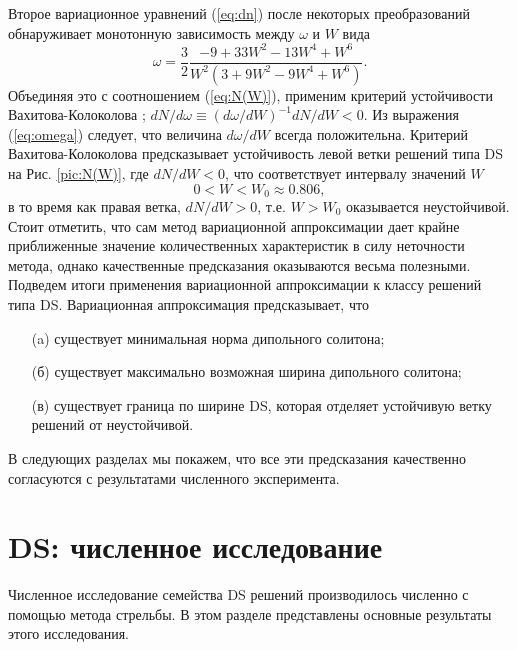 Второе вариационное уравнений (\ref{eq:dn}) после некоторых преобразований обнаруживает монотонную зависимость между $\omega$ и $W$ вида
%
\begin{equation}
\omega =\frac{3}{2}\frac{-9+33W^{2}-13W^{4}+W^{6}}{W^{2}\left( 3+9W^{2}-9W^{4}+W^{6}\right) }.
\label{eq:omega}
\end{equation}
%
Объединяя это с соотношением (\ref{eq:N(W)}), применим критерий устойчивости Вахитова-Колоколова \cite{JYang}; $dN / d\omega \equiv (d\omega / dW)^{-1} dN / dW < 0$.
Из выражения (\ref{eq:omega}) следует, что величина $d\omega / dW$ всегда положительна.
Критерий Вахитова-Колоколова предсказывает устойчивость левой ветки решений типа DS на Рис. \ref{pic:N(W)}, где $dN / dW < 0$, что соответствует интервалу значений $W$
%
\begin{equation}
0 < W < W_0 \approx 0.806,
\end{equation}
%
в то время как правая ветка, $dN / dW > 0$, т.е. $W > W_0$ оказывается неустойчивой.
Стоит отметить, что сам метод вариационной аппроксимации дает крайне приближенные значение количественных характеристик в силу неточности метода, однако качественные предсказания оказываются весьма полезными.
Подведем итоги применения вариационной аппроксимации к классу решений типа DS.
Вариационная аппроксимация предсказывает, что
%
\begin{itemize}
\item[(a)] существует минимальная норма дипольного солитона;
\item[(б)] существует максимально возможная ширина дипольного солитона;
\item[(в)] существует граница по ширине DS, которая отделяет устойчивую ветку решений от неустойчивой.
\end{itemize}
%
В следующих разделах мы покажем, что все эти предсказания качественно согласуются с результатами численного эксперимента.

\section{DS: численное исследование}

Численное исследование семейства DS решений производилось численно с помощью метода стрельбы.
В этом разделе представлены основные результаты этого исследования.

